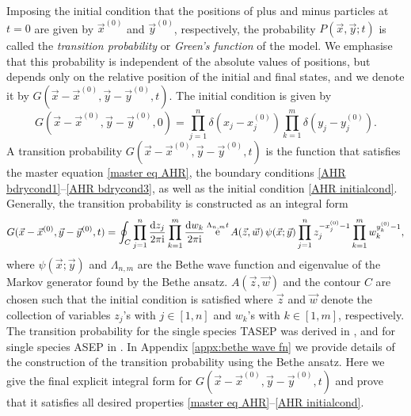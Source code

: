 \documentclass[cmp]{svjour}
\numberwithin{theorem}{section}
\numberwithin{equation}{section}
\DeclareMathOperator{\e}{e}
\def\dd{{\rm d}}
\def\ii{{\rm i}}
\begin{document}
Imposing the initial condition that the positions of plus and minus particles at $t=0$ are given by  $\vec{x}^{(0)}$ and $\vec{y}^{(0)}$, respectively, the probability $P(\vec{x},\vec{y};t)$ is called the \textit{transition probability} or \textit{Green's function} of the model. We emphasise that this probability is independent of the absolute values of positions, but depends only on the relative position of the initial and final states, and we denote it by $G(\vec{x}-\vec{x}^{(0)},\vec{y}-\vec{y}^{(0)},t)$.
The initial condition is given by
\begin{equation}
G(\vec{x}-\vec{x}^{(0)},\vec{y}-\vec{y}^{(0)},0)
=
\prod_{j=1}^n \delta(x_j-x_j^{(0)}) \prod_{k=1}^m \delta(y_j-y_j^{(0)}).
\label{AHR initialcond}
\end{equation}
A transition probability $G(\vec{x}-\vec{x}^{(0)},\vec{y}-\vec{y}^{(0)},t)$ is the function that satisfies the master equation \eqref{master eq AHR}, the boundary conditions \eqref{AHR bdrycond1}--\eqref{AHR bdrycond3}, as well as the initial condition \eqref{AHR initialcond}. Generally, the transition probability is constructed as an integral form
\begin{align*}
G(\vec{x}-\vec{x}^{(0)},\vec{y}-\vec{y}^{(0)},t)
=
\oint_{C} \prod_{j=1}^n \frac{\dd z_j }{2\pi \ii}
\prod_{k=1}^m \frac{\dd w_k }{2\pi \ii}
\e^{\Lambda_{n,m} t}  A(\vec{z},\vec{w})  \,
\psi(\vec{x};\vec{y}) \prod_{j=1}^{n} z_{j}^{-x^{(0)}_j-1} \prod_{k=1}^m w_{k}^{y^{(0)}_k-1},
\end{align*}
where $\psi(\vec{x};\vec{y})$ and $\Lambda_{n,m}$ are the Bethe wave function and eigenvalue of the Markov generator found by the Bethe ansatz. $A(\vec{z},\vec{w})$ and the contour $C$ are chosen such that the initial condition is satisfied where $\vec{z}$ and $\vec{w}$ denote the collection of variables $z_j$'s with $j\in [1,n]$ and $w_k$'s with $k\in [1,m]$, respectively. The transition probability for the single species TASEP was derived in \cite{S1997}, and for single species ASEP in \cite{tracy2008integral}. In Appendix \ref{appx:bethe wave fn} we provide details of the construction of the transition probability using the Bethe ansatz. Here we give the final explicit integral form for $G(\vec{x}-\vec{x}^{(0)},\vec{y}-\vec{y}^{(0)},t)$ and prove that it satisfies all desired properties \eqref{master eq AHR}--\eqref{AHR initialcond}.
\end{document}
